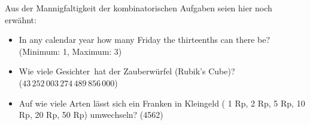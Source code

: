 \documentclass[%
11pt,%
twoside,%
titlepage,%
german,%
headsepline%
]{scrartcl}
\begin{document}
  
  
  
 Aus der Mannigfaltigkeit der kombinatorischen Aufgaben seien hier noch erwähnt:
 \begin{itemize}
 \item In any calendar year how many Friday the thirteenths can there be? (Minimum: 1, Maximum: 3)
 \item Wie viele \glqq Gesichter\grqq\ hat der Zauberwürfel (Rubik's Cube)?\\ ($43\,252\,003\,274\,489\,856\,000$)
 \item Auf wie viele Arten lässt sich ein Franken in Kleingeld ( 1 Rp, 2 Rp, 5 Rp, 10 Rp, 20 Rp, 50 Rp) umwechseln? (4562)
 \end{itemize}
 
\end{document}
